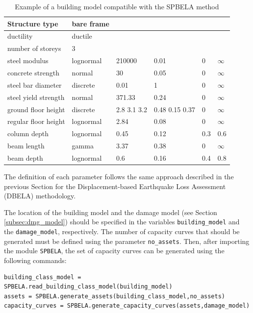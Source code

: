 \begin {table}[htb]
\caption{Example of a building model compatible with the SPBELA method}
\label{table:building_model_spbela}
\begin{center}
  \begin{tabular}{ | l | l | l | l | l | l |}
  \hline
Structure type & bare frame &  &  &  &  \\ \hline
ductility & ductile &  &  &  &  \\ \hline
number of storeys & 3 &  &  &  &  \\ \hline
steel modulus & lognormal & 210000 & 0.01 & 0 & $\infty$ \\ \hline
concrete strength & normal & 30 & 0.05 & 0 & $\infty$ \\ \hline
steel bar diameter & discrete & 0.01 & 1 & 0 & $\infty$ \\ \hline
steel yield strength & normal & 371.33 & 0.24 & 0 & $\infty$ \\ \hline
ground floor height & discrete & 2.8 3.1 3.2 & 0.48 0.15 0.37 & 0 & $\infty$ \\ \hline
regular floor height & lognormal & 2.84 & 0.08 & 0 & $\infty$ \\ \hline
column depth & lognormal & 0.45 & 0.12 & 0.3 & 0.6 \\ \hline
beam length & gamma & 3.37 & 0.38 & 0 & $\infty$ \\ \hline
beam depth & lognormal & 0.6 & 0.16 & 0.4 & 0.8 \\ \hline
  \end{tabular}
\end{center}
\end{table}

The definition of each parameter follows the same approach described in the previous Section for the Displacement-based Earthquake Loss Assessment (DBELA) methodology.

The location of the building model and the damage model (see Section \ref{subsec:dmg_model}) should be specified in the variables \verb=building_model= and the \verb=damage_model=, respectively. The number of capacity curves that should be generated must be defined using the parameter \verb=no_assets=. Then, after importing the module \verb=SPBELA=, the set of capacity curves can be generated using the following commands:

\begin{Verbatim}[frame=single, commandchars=\\\{\}, samepage=true]
building_class_model = SPBELA.read_building_class_model(building_model)
assets = SPBELA.generate_assets(building_class_model,no_assets)
capacity_curves = SPBELA.generate_capacity_curves(assets,damage_model)
\end{Verbatim}

